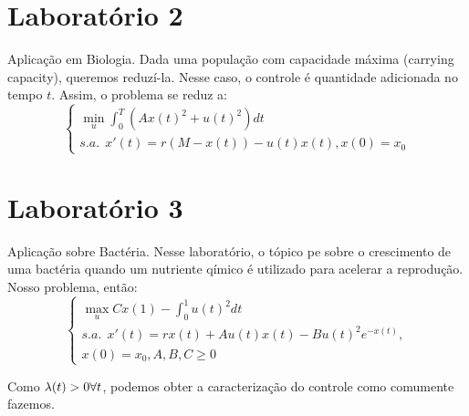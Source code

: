 \section{Laboratório 2}

Aplicação em Biologia. Dada uma população com capacidade máxima (carrying capacity), queremos reduzí-la. Nesse caso, o controle é quantidade adicionada no tempo $t$. Assim, o problema se reduz a:
\begin{equation}
    \begin{cases}
    \min_u \int_0^T (Ax(t)^2 + u(t)^2) dt \\
    s.a.~~ x'(t) = r(M - x(t)) - u(t)x(t), x(0) = x_0
    \end{cases}
\end{equation}

\section{Laboratório 3}

Aplicação sobre Bactéria. Nesse laboratório, o tópico pe sobre o crescimento de uma bactéria quando um nutriente qímico é utilizado para acelerar a reprodução. Nosso problema, então:
\begin{equation}
    \begin{cases}
    \max_u Cx(1) - \int_0^1 u(t)^2 dt \\
    s.a.~~ x'(t) = rx(t) + Au(t)x(t) - Bu(t)^2e^{-x(t)}, \\
    x(0) = x_0, A, B, C \geq 0
    \end{cases}
\end{equation}

Como $\lambda(t) > 0 \forall t$, podemos obter a caracterização do controle como comumente fazemos.

